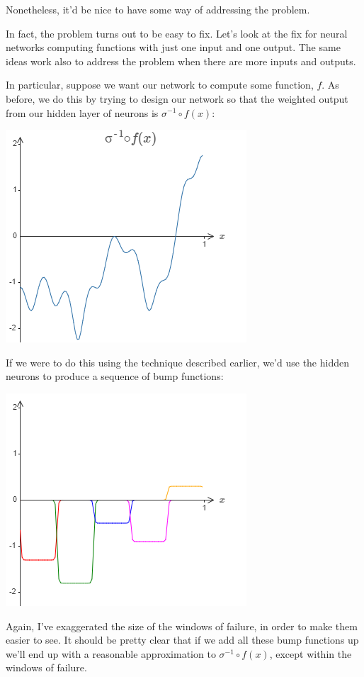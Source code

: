 \documentclass[a4paper,twoside,10pt]{book}
\begin{document}
Nonetheless, it'd be nice to have some way of addressing the problem.

In fact, the problem turns out to be easy to fix. Let's look at the fix for neural networks computing functions with just one input and one output. The same ideas work also to address the problem when there are more inputs and outputs.

In particular, suppose we want our network to compute some function, $f$. As before, we do this by trying to design our network so that the weighted output from our hidden layer of neurons is $\sigma^{-1}\circ f(x)$:
\begin{center}
	\includegraphics[width=0.6\linewidth]{figures/ch4/tikz454}
\end{center}
If we were to do this using the technique described earlier, we'd use the hidden neurons to produce a sequence of bump functions:
\begin{center}
	\includegraphics[width=0.4\linewidth]{figures/ch4/tikz455}
\end{center}
Again, I've exaggerated the size of the windows of failure, in order to make them easier to see. It should be pretty clear that if we add all these bump functions up we'll end up with a reasonable approximation to $\sigma^{-1}\circ f(x)$, except within the windows of failure.
\end{document}
